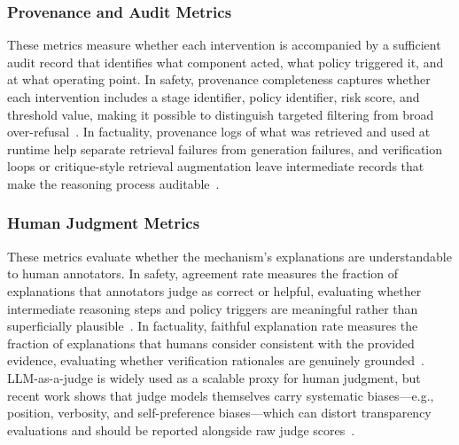 \subsubsection{Provenance and Audit Metrics}
These metrics measure whether each intervention is accompanied by a sufficient audit record that identifies what component acted, what policy triggered it, and at what operating point. In safety, provenance completeness captures whether each intervention includes a stage identifier, policy identifier, risk score, and threshold value, making it possible to distinguish targeted filtering from broad over-refusal~\citep{song2024auditllmmultiagentcollaborationlogbased, zhou2025guardiansafeguardingllmmultiagent, Liu2025GuardReasonerTR, chen2025safeptr}. In factuality, provenance logs of what was retrieved and used at runtime help separate retrieval failures from generation failures, and verification loops or critique-style retrieval augmentation leave intermediate records that make the reasoning process auditable~\citep{dhuliawala2024chain, asai2024self, wan2024dell}.

\subsubsection{Human Judgment Metrics}
These metrics evaluate whether the mechanism's explanations are understandable to human annotators. In safety, agreement rate measures the fraction of explanations that annotators judge as correct or helpful, evaluating whether intermediate reasoning steps and policy triggers are meaningful rather than superficially plausible~\citep{ji2024defending, Kang2024R2GuardRR}. In factuality, faithful explanation rate measures the fraction of explanations that humans consider consistent with the provided evidence, evaluating whether verification rationales are genuinely grounded~\citep{kim2024llmsproducefaithfulexplanations, asai2024self}. LLM-as-a-judge is widely used as a scalable proxy for human judgment, but recent work shows that judge models themselves carry systematic biases---e.g., position, verbosity, and self-preference biases---which can distort transparency evaluations and should be reported alongside raw judge scores~\citep{ye2024justice}.

